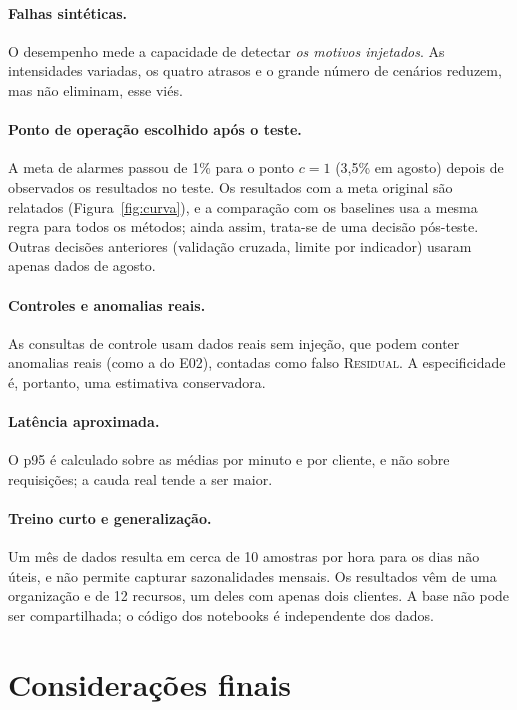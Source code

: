 \documentclass[sigconf,nonacm]{acmart}
\newcommand{\Residual}{\textsc{Residual}\xspace}
\begin{document}
\paragraph{Falhas sintéticas.} O desempenho mede a capacidade de detectar \emph{os motivos injetados}. As intensidades variadas, os quatro atrasos e o grande número de cenários reduzem, mas não eliminam, esse viés.

\paragraph{Ponto de operação escolhido após o teste.} A meta de alarmes passou de 1\% para o ponto $c=1$ (3,5\% em agosto) depois de observados os resultados no teste. Os resultados com a meta original são relatados (Figura~\ref{fig:curva}), e a comparação com os baselines usa a mesma regra para todos os métodos; ainda assim, trata-se de uma decisão pós-teste. Outras decisões anteriores (validação cruzada, limite por indicador) usaram apenas dados de agosto.

\paragraph{Controles e anomalias reais.} As consultas de controle usam dados reais sem injeção, que podem conter anomalias reais (como a do E02), contadas como falso \Residual. A especificidade é, portanto, uma estimativa conservadora.

\paragraph{Latência aproximada.} O p95 é calculado sobre as médias por minuto e por cliente, e não sobre requisições; a cauda real tende a ser maior.

\paragraph{Treino curto e generalização.} Um mês de dados resulta em cerca de 10 amostras por hora para os dias não úteis, e não permite capturar sazonalidades mensais. Os resultados vêm de uma organização e de 12 recursos, um deles com apenas dois clientes. A base não pode ser compartilhada; o código dos notebooks é independente dos dados.

\section{Considerações finais}\label{sec:conclusao}
\end{document}
